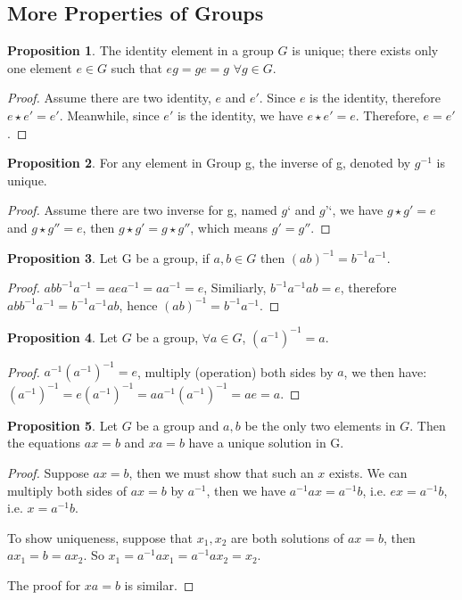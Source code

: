 \documentclass{article}
\theoremstyle{definition}
\newtheorem{prop}{Proposition}[subsection]
\begin{document}
\subsection{More Properties of Groups}

\begin{prop}
The identity element in a group $G$ is unique; there exists only one element $e \in G$ such that $eg = ge = g $ $\forall g \in G$.
\begin{proof}
Assume there are two identity, $e $ and $ e'$. Since $e$ is the identity, therefore $e\star e' = e'$. Meanwhile, since $e'$ is the identity, we have $e \star e' = e$. Therefore, $e = e'$.
\end{proof}
\end{prop}

\begin{prop}
For any element in Group g, the inverse of g, denoted by $g^{-1}$ is unique.
\begin{proof}
Assume there are two inverse for g, named $g‘$ and $g’‘$, we have $g \star g' = e$ and $g \star g'' = e$, then $g \star g' = g \star g''$, which means $g' = g''$.
\end{proof}
\end{prop}

\begin{prop}
Let G be a group, if $a, b \in G$ then $(ab)^{-1} = b^{-1}a^{-1}$.
\begin{proof}
$abb^{-1}a^{-1} = aea^{-1} = aa^{-1} = e $, Similiarly, $b^{-1}a^{-1}ab = e$, therefore $abb^{-1}a^{-1} = b^{-1}a^{-1}ab $, hence $(ab)^{-1} = b^{-1}a^{-1}$.
\end{proof}
\end{prop}

\begin{prop}
Let $G$ be a group, $\forall a \in G$, $(a^{-1})^{-1}=a$.
\begin{proof}
$a^{-1}(a^{-1})^{-1} = e$, multiply (operation) both sides by $a$, we then have: $(a^{-1})^{-1} = e(a^{-1})^{-1} = aa^{-1}(a^{-1})^{-1} = ae = a $.
\end{proof}
\end{prop}

\begin{prop}
Let $G$ be a group and $a, b$ be the only two elements in $G$. Then the equations $ax=b$ and $xa=b$ have a unique solution in G.
\begin{proof}
Suppose $ax=b$, then we must show that such an $x$ exists. We can multiply both sides of $ax=b$ by $a^{-1}$, then we have $a^{-1}ax = a^{-1}b$, i.e. $ex = a^{-1}b$, i.e. $x = a^{-1}b$.

To show uniqueness, suppose that $x_{1},x_{2}$ are both solutions of $ax=b$, then $ax_{1}=b=ax_{2}$. So $x_{1}=a^{-1}ax_{1} = a^{-1}ax_{2}=x_{2}$.

The proof for $xa=b$ is similar.
\end{proof}
\end{prop}
\end{document}
